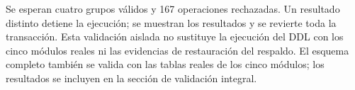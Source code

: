 Se esperan cuatro grupos válidos y 167 operaciones rechazadas. Un
resultado distinto detiene la ejecución; se muestran los resultados y
se revierte toda la transacción. Esta validación aislada no sustituye
la ejecución del DDL con los cinco módulos reales ni las evidencias de
restauración del respaldo. El esquema completo también se valida con las tablas reales de los cinco módulos; los resultados se incluyen en la sección de validación integral.
\endgroup

